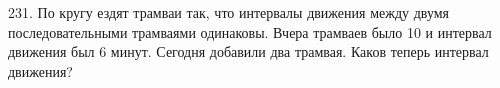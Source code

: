 231. По кругу ездят трамваи так, что интервалы движения между двумя последовательными трамваями одинаковы. Вчера трамваев было 10 и интервал движения был 6 минут. Сегодня добавили два трамвая. Каков теперь интервал движения?\\
